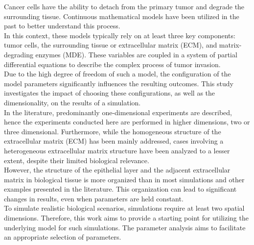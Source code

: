 Cancer cells have the ability to detach from the primary tumor and degrade the surrounding tissue. Continuous mathematical models have been utilized in the past to better understand this process.\\
In this context, these models typically rely on at least three key components: tumor cells, the surrounding tissue or extracellular matrix (ECM), and matrix-degrading enzymes (MDE). These variables are coupled in a system of partial differential equations to describe the complex process of tumor invasion.\\
Due to the high degree of freedom of such a model, the configuration of the model parameters significantly influences the resulting outcomes. This study investigates the impact of choosing these configurations, as well as the dimensionality, on the results of a simulation.\\
In the literature, predominantly one-dimensional experiments are described, hence the experiments conducted here are performed in higher dimensions, two or three dimensional. Furthermore, while the homogeneous structure of the extracellular matrix (ECM) has been mainly addressed, cases involving a heterogeneous extracellular matrix structure have been analyzed to a lesser extent, despite their limited biological relevance.\\
However, the structure of the epithelial layer and the adjacent extracellular matrix in biological tissue is more organized than in most simulations and other examples presented in the literature. This organization can lead to significant changes in results, even when parameters are held constant.\\
To simulate realistic biological scenarios, simulations require at least two spatial dimensions. Therefore, this work aims to provide a starting point for utilizing the underlying model for such simulations. The parameter analysis aims to facilitate an appropriate selection of parameters.
